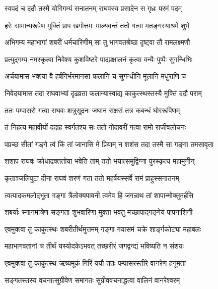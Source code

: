 \twolineshloka
{स्वपदं च ददौ तस्मै योगिगम्यं सनातनम्}
{राघवस्य प्रसादेन स गृध्रः परमं पदम्}%

\twolineshloka
{हरेः सामान्यरूपेण मुक्तिं प्राप खगोत्तमः}
{माल्यवन्तं ततो गत्वा मतङ्गस्याश्रमे शुभे}%

\twolineshloka
{अभिगम्य महाभागां शबरीं धर्मचारिणीम्}
{सा तु भागवतश्रेष्ठा दृष्ट्वा तौ रामलक्ष्मणौ}%

\twolineshloka
{प्रत्युद्गम्य नमस्कृत्वा निवेश्य कुशविष्टरे}
{पादप्रक्षालनं कृत्वा वन्यैः पुष्पैः सुगन्धिभिः}%

\twolineshloka
{अर्चयामास भक्त्या वै हर्षनिर्भरमानसा}
{फलानि च सुगन्धीनि मूलानि मधुराणि च}%

\twolineshloka
{निवेदयामास तदा राघवाभ्यां दृढव्रता}
{फलान्यास्वाद्य काकुत्स्थस्तस्यै मुक्तिं ददौ पराम्}%

\twolineshloka
{ततः पम्पासरो गत्वा राघवः शत्रुसूदनः}
{जघान राक्षसं तत्र कबन्धं घोररूपिणम्}%

\twolineshloka
{तं निहत्य महावीर्यो ददाह स्वर्गतश्च सः}
{ततो गोदावरीं गत्वा रामो राजीवलोचनः}%

\twolineshloka
{पप्रच्छ सीतां गङ्गे त्वं किं तां जानासि मे प्रियाम्}
{न शशंस तदा तस्मै सा गङ्गा तमसावृता}%

\twolineshloka
{शशाप राघवः क्रोधाद्रक्ततोया भवेति ताम्}
{ततो भयात्समुद्विग्ना पुरस्कृत्य महामुनीन्}%

\twolineshloka
{कृताञ्जलिपुटा दीना राघवं शरणं गता}
{ततो महर्षयस्सर्वे रामं प्राहुस्सनातनम्}%


\twolineshloka
{त्वत्पादकमलोद्भूता गङ्गा त्रैलोक्यपावनी}
{त्वमेव हि जगन्नाथ तां शापान्मोक्तुमर्हसि}%




\twolineshloka
{शबर्याः स्नानमात्रेण सङ्गता शुभवारिणा}
{मुक्ता भवतु मच्छापाद्गङ्गेयं पापनाशिनी}%

\twolineshloka
{एवमुक्त्वा तु काकुत्स्थः शबरीतीर्थमुत्तमम्}
{गङ्गा गयासमं चक्रे शार्ङ्गकोट्या महाबलः}%

\twolineshloka
{महाभागवतानां च तीर्थं यस्योदकेऽभवत्}
{तच्छरीरं जगद्वन्द्यं भविष्यति न संशयः}%

\twolineshloka
{एवमुक्त्वा तु काकुत्स्थ ऋष्यमूकं गिरिं ययौ}
{ततः पम्पासरस्तीरे वानरेण हनूमता}%

\twolineshloka
{सङ्गतस्तस्य वचनात्सुग्रीवेण समागतः}
{सुग्रीववचनाद्धत्वा वालिनं वानरेश्वरम्}%


